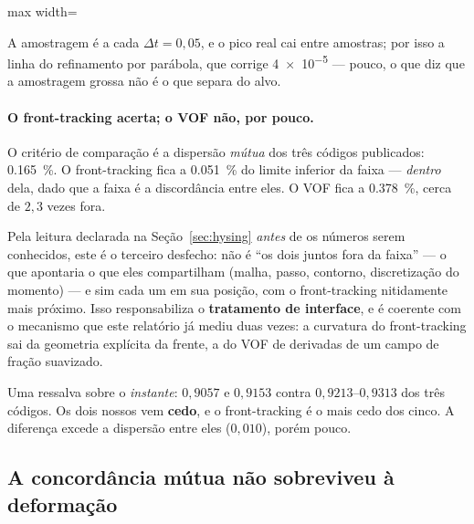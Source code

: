 \begin{adjustbox}{max width=\linewidth}
\end{adjustbox}

A amostragem \'e a cada $\Delta t = 0{,}05$, e o pico real cai entre amostras;
por isso a linha do refinamento por par\'abola, que corrige \num{4e-5} --- pouco,
o que diz que a amostragem grossa n\~ao \'e o que separa do alvo.

\paragraph{O front-tracking acerta; o VOF n\~ao, por pouco.} O crit\'erio de
compara\c{c}\~ao \'e a dispers\~ao \emph{m\'utua} dos tr\^es c\'odigos publicados:
\SI{0.165}{\percent}. O front-tracking fica a \SI{0.051}{\percent} do limite
inferior da faixa --- \emph{dentro} dela, dado que a faixa \'e a discord\^ancia
entre eles. O VOF fica a \SI{0.378}{\percent}, cerca de $2{,}3$ vezes fora.

Pela leitura declarada na Se\c{c}\~ao~\ref{sec:hysing} \emph{antes} de os
n\'umeros serem conhecidos, este \'e o terceiro desfecho: n\~ao \'e ``os dois
juntos fora da faixa'' --- o que apontaria o que eles compartilham (malha, passo,
contorno, discretiza\c{c}\~ao do momento) --- e sim cada um em sua posi\c{c}\~ao,
com o front-tracking nitidamente mais pr\'oximo. Isso responsabiliza o
\textbf{tratamento de interface}, e \'e coerente com o mecanismo que este
relat\'orio j\'a mediu duas vezes: a curvatura do front-tracking sai da geometria
expl\'icita da frente, a do VOF de derivadas de um campo de fra\c{c}\~ao
suavizado.

Uma ressalva sobre o \emph{instante}: $0{,}9057$ e $0{,}9153$ contra
$0{,}9213$--$0{,}9313$ dos tr\^es c\'odigos. Os dois nossos vem \textbf{cedo}, e o
front-tracking \'e o mais cedo dos cinco. A diferen\c{c}a excede a
dispers\~ao entre eles ($0{,}010$), por\'em pouco.

\subsection{A concord\^ancia m\'utua n\~ao sobreviveu \`a deforma\c{c}\~ao}
\label{sec:divergencia}

